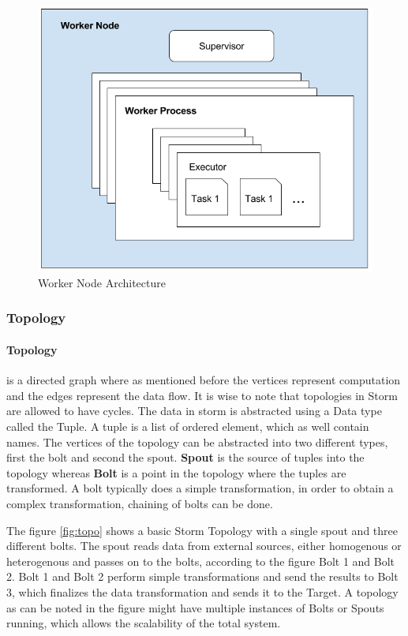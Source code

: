 \documentclass[runningheads,a4paper]{llncs}[2015/06/24]
\begin{document}
\begin{figure}
  \begin{center}
    \includegraphics[width=.7\textwidth]{worker.png}
    \caption{Worker Node Architecture}
    \label{fig:workerarch}
   \end{center}
\end{figure}

\subsubsection{Topology}
\paragraph{Topology} is a directed graph where as mentioned before the vertices represent computation and the edges represent the data flow. It is wise to note that topologies in Storm are allowed to have cycles. The data in storm is abstracted using a Data type called the Tuple. A tuple is a list of ordered element, which as well contain names. The vertices of the topology can be abstracted into two different types, first the bolt and second the spout. \textbf{Spout} is the source of tuples into the topology whereas \textbf{Bolt} is a point in the topology where the tuples are transformed. A bolt typically does a simple transformation, in order to obtain a complex transformation, chaining of bolts can be done. 

The figure \ref{fig:topo} shows a basic Storm Topology with a single spout and three different bolts. The spout reads data from external sources, either homogenous or heterogenous and passes on to the bolts, according to the figure Bolt 1 and Bolt 2. Bolt 1 and Bolt 2 perform simple transformations and send the results to Bolt 3, which finalizes the data transformation and sends it to the Target. A topology as can be noted in the figure might have multiple instances of Bolts or Spouts running, which allows the scalability of the total system.
\end{document}
